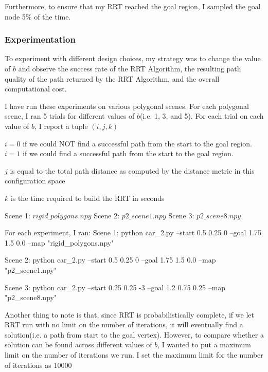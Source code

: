 \documentclass{article}
\begin{document}
Furthermore, to ensure that my RRT reached the goal region, I sampled the goal node 5\% of the time. 

\subsubsection{Experimentation}
To experiment with different design choices, my strategy was to change the value of $b$ and observe the success rate of the RRT Algorithm, the resulting path quality of the path returned by the RRT Algorithm, and the overall computational cost. 

I have run these experiments on various polygonal scenes. For each polygonal scene, I ran 5 trials for different values of $b$(i.e. 1, 3, and 5). For each trial on each value of $b$, I report a tuple $(i, j, k)$ \newline 

$i = 0$ if we could NOT find a successful path from the start to the goal region. $i = 1$ if we could find a successful path from the start to the goal region. \newline 

$j$ is equal to the total path distance as computed by the distance metric in this configuration space \newline 

$k$ is the time required to build the RRT in seconds \newline 

Scene 1: $rigid\_polygons.npy$ \newline 
Scene 2: $p2\_scene1.npy$ \newline 
Scene 3: $p2\_scene8.npy$ \newline 

For each experiment, I ran: \newline 
Scene 1: python car\_2.py --start 0.5 0.25 0 --goal 1.75 1.5 0.0 --map "rigid\_polygons.npy" \newline 

Scene 2: python car\_2.py --start 0.5 0.25 0 --goal 1.75 1.5 0.0 --map "p2\_scene1.npy" \newline

Scene 3: python car\_2.py --start 0.25 0.25 -3 --goal 1.2 0.75 0.25 --map "p2\_scene8.npy" \newline


Another thing to note is that, since RRT is probabilistically complete, if we let RRT run with no limit on the number of iterations, it will eventually find a solution(i.e. a path from start to the goal vertex). However, to compare whether a solution can be found across different values of $b$, I wanted to put a maximum limit on the number of iterations we run. I set the maximum limit for the number of iterations as 10000 
 \newpage 
 
\end{document}
